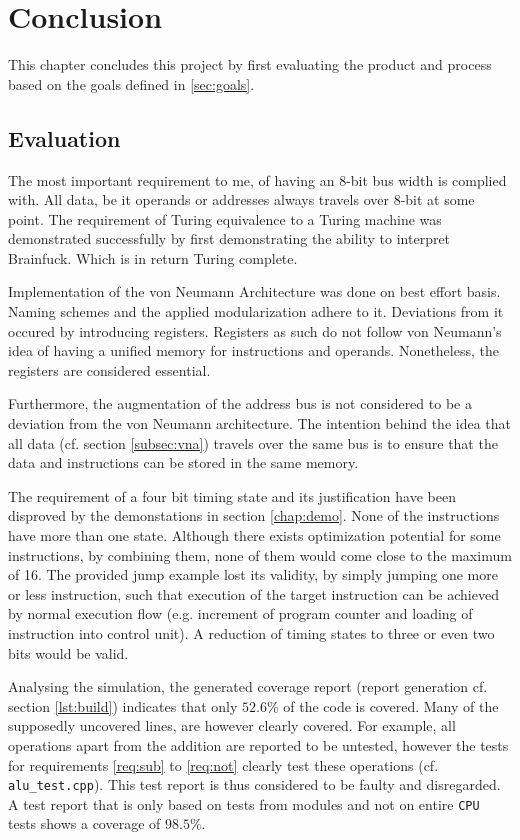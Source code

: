 \chapter{Conclusion} \label{chap:conclusion}
This chapter concludes this project by first evaluating the product and process based on the goals defined in \ref{sec:goals}.

\section{Evaluation}
The most important requirement to me, of having an 8-bit bus width is complied with. All data, be it operands or addresses always travels over 8-bit at some point. The requirement of Turing equivalence to a Turing machine was demonstrated successfully by first demonstrating the ability to interpret Brainfuck. Which is in return Turing complete.

Implementation of the von Neumann Architecture was done on best effort basis. Naming schemes and the applied modularization adhere to it. Deviations from it occured by introducing registers. Registers as such do not follow von Neumann's idea of having a unified memory for instructions and operands. Nonetheless, the registers are considered essential.

Furthermore, the augmentation of the address bus is not considered to be a deviation from the von Neumann architecture. The intention behind the idea that all data (cf. section \ref{subsec:vna}) travels over the same bus is to ensure that the data and instructions can be stored in the same memory.

The requirement of a four bit timing state and its justification have been disproved by the demonstations in section \ref{chap:demo}. None of the instructions have more than one state. Although there exists optimization potential for some instructions, by combining them, none of them would come close to the maximum of 16. The provided jump example lost its validity, by simply jumping one more or less instruction, such that execution of the target instruction can be achieved by normal execution flow (e.g. increment of program counter and loading of instruction into control unit). A reduction of timing states to three or even two bits would be valid.

Analysing the simulation, the generated coverage report (report generation cf. section \ref{lst:build}) indicates that only $52.6\%$ of the code is covered. Many of the supposedly uncovered lines, are however clearly covered. For example, all operations apart from the addition are reported to be untested, however the tests for requirements \ref{req:sub} to \ref{req:not} clearly test these operations (cf. \texttt{alu\_test.cpp}). This test report is thus considered to be faulty and disregarded. A test report that is only based on tests from modules and not on entire \texttt{CPU} tests shows a coverage of $98.5\%$.

